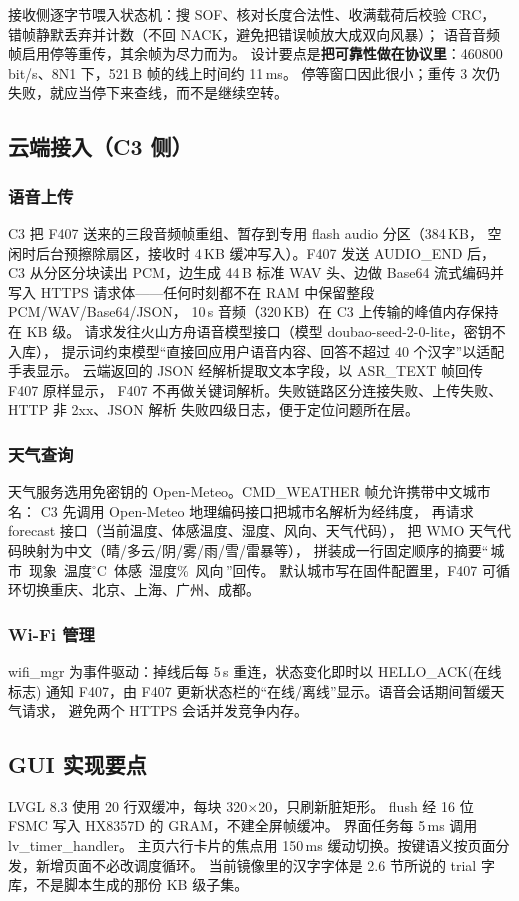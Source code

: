 接收侧逐字节喂入状态机：搜 SOF、核对长度合法性、收满载荷后校验 CRC，
错帧静默丢弃并计数（不回 NACK，避免把错误帧放大成双向风暴）；
语音音频帧启用停等重传，其余帧为尽力而为。
设计要点是\textbf{把可靠性做在协议里}：460800\,bit/s、8N1 下，521\,B 帧的线上时间约 11\,ms。
停等窗口因此很小；重传 3 次仍失败，就应当停下来查线，而不是继续空转。

\subsection{云端接入（C3 侧）}
\subsubsection{语音上传}
C3 把 F407 送来的三段音频帧重组、暂存到专用 flash audio 分区（384\,KB，
空闲时后台预擦除扇区，接收时 4\,KB 缓冲写入）。F407 发送 AUDIO\_END 后，
C3 从分区分块读出 PCM，边生成 44\,B 标准 WAV 头、边做 Base64 流式编码并写入
HTTPS 请求体——任何时刻都不在 RAM 中保留整段 PCM/WAV/Base64/JSON，
10\,s 音频（320\,KB）在 C3 上传输的峰值内存保持在 KB 级。
请求发往火山方舟语音模型接口（模型 doubao-seed-2-0-lite，密钥不入库），
提示词约束模型``直接回应用户语音内容、回答不超过 40 个汉字''以适配手表显示。
云端返回的 JSON 经解析提取文本字段，以 ASR\_TEXT 帧回传 F407 原样显示，
F407 不再做关键词解析。失败链路区分连接失败、上传失败、HTTP 非 2xx、JSON 解析
失败四级日志，便于定位问题所在层。

\subsubsection{天气查询}
天气服务选用免密钥的 Open-Meteo。CMD\_WEATHER 帧允许携带中文城市名：
C3 先调用 Open-Meteo 地理编码接口把城市名解析为经纬度，
再请求 forecast 接口（当前温度、体感温度、湿度、风向、天气代码），
把 WMO 天气代码映射为中文（晴/多云/阴/雾/雨/雪/雷暴等），
拼装成一行固定顺序的摘要``\,城市\ 现象\ 温度$^\circ$C\ 体感\ 湿度\%\ 风向\,''回传。
默认城市写在固件配置里，F407 可循环切换重庆、北京、上海、广州、成都。

\subsubsection{Wi-Fi 管理}
wifi\_mgr 为事件驱动：掉线后每 5\,s 重连，状态变化即时以 HELLO\_ACK(在线标志)
通知 F407，由 F407 更新状态栏的``在线/离线''显示。语音会话期间暂缓天气请求，
避免两个 HTTPS 会话并发竞争内存。

\subsection{GUI 实现要点}
LVGL 8.3 使用 20 行双缓冲，每块 320$\times$20，只刷新脏矩形。
flush 经 16 位 FSMC 写入 HX8357D 的 GRAM，不建全屏帧缓冲。
界面任务每 5\,ms 调用 lv\_timer\_handler。
主页六行卡片的焦点用 150\,ms 缓动切换。按键语义按页面分发，新增页面不必改调度循环。
当前镜像里的汉字字体是 2.6 节所说的 trial 字库，不是脚本生成的那份 KB 级子集。

